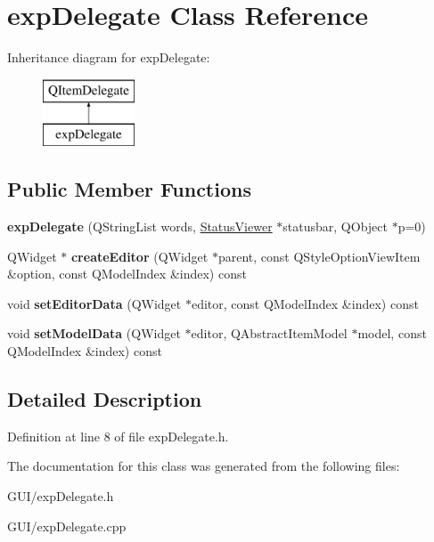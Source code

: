 \hypertarget{classexp_delegate}{}\section{exp\+Delegate Class Reference}
\label{classexp_delegate}
Inheritance diagram for exp\+Delegate\+:\begin{figure}[H]
\begin{center}
\leavevmode
\includegraphics[height=2.000000cm]{classexp_delegate}
\end{center}
\end{figure}
\subsection*{Public Member Functions}
\begin{DoxyCompactItemize}
\item 
\mbox{\label{classexp_delegate_a0559692770a60f9de6522330672873d8}} 
{\bfseries exp\+Delegate} (Q\+String\+List words, \hyperlink{class_status_viewer}{Status\+Viewer} $\ast$statusbar, Q\+Object $\ast$p=0)
\item 
\mbox{\label{classexp_delegate_a4f717f38ed72bb061ee661c2e1715d59}} 
Q\+Widget $\ast$ {\bfseries create\+Editor} (Q\+Widget $\ast$parent, const Q\+Style\+Option\+View\+Item \&option, const Q\+Model\+Index \&index) const
\item 
\mbox{\label{classexp_delegate_a1f066a4d7c378b390209af6afbda3085}} 
void {\bfseries set\+Editor\+Data} (Q\+Widget $\ast$editor, const Q\+Model\+Index \&index) const
\item 
\mbox{\label{classexp_delegate_a89c73323ce854a5db5b52b53bcbf0378}} 
void {\bfseries set\+Model\+Data} (Q\+Widget $\ast$editor, Q\+Abstract\+Item\+Model $\ast$model, const Q\+Model\+Index \&index) const
\end{DoxyCompactItemize}


\subsection{Detailed Description}


Definition at line 8 of file exp\+Delegate.\+h.



The documentation for this class was generated from the following files\+:\begin{DoxyCompactItemize}
\item 
G\+U\+I/exp\+Delegate.\+h\item 
G\+U\+I/exp\+Delegate.\+cpp\end{DoxyCompactItemize}
